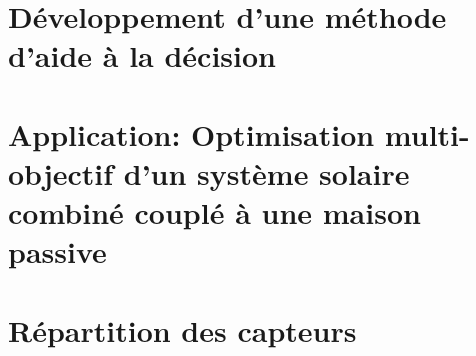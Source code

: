 \documentclass[11pt, oneside, fixOverflow]{JeremyThesis}
\begin{document}
\chapter{Développement d’une méthode d’aide à la décision}
% 

\chapter{Application: Optimisation multi-objectif d’un système solaire combiné couplé à une maison passive}


% 


\newpage
\addappheadtotoc
\appendix
\appendixpage

% 
% 

% 

\chapter*{Répartition des capteurs} %
\label{cha:repartition_des_capteurs}



\newpage
\printbibliography[title={Bibliographie}]
\end{document}
